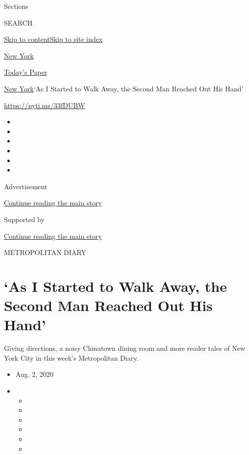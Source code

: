 Sections

SEARCH

\protect\hyperlink{site-content}{Skip to
content}\protect\hyperlink{site-index}{Skip to site index}

\href{https://www.nytimes.com/section/nyregion}{New York}

\href{https://myaccount.nytimes.com/auth/login?response_type=cookie\&client_id=vi}{}

\href{https://www.nytimes.com/section/todayspaper}{Today's Paper}

\href{/section/nyregion}{New York}\textbar{}`As I Started to Walk Away,
the Second Man Reached Out His Hand'

\url{https://nyti.ms/33fDUBW}

\begin{itemize}
\item
\item
\item
\item
\item
\item
\end{itemize}

Advertisement

\protect\hyperlink{after-top}{Continue reading the main story}

Supported by

\protect\hyperlink{after-sponsor}{Continue reading the main story}

METROPOLITAN DIARY

\hypertarget{as-i-started-to-walk-away-the-second-man-reached-out-his-hand}{%
\section{`As I Started to Walk Away, the Second Man Reached Out His
Hand'}\label{as-i-started-to-walk-away-the-second-man-reached-out-his-hand}}

Giving directions, a noisy Chinatown dining room and more reader tales
of New York City in this week's Metropolitan Diary.

\begin{itemize}
\item
  Aug. 2, 2020
\item
  \begin{itemize}
  \item
  \item
  \item
  \item
  \item
  \item
  \end{itemize}
\end{itemize}

